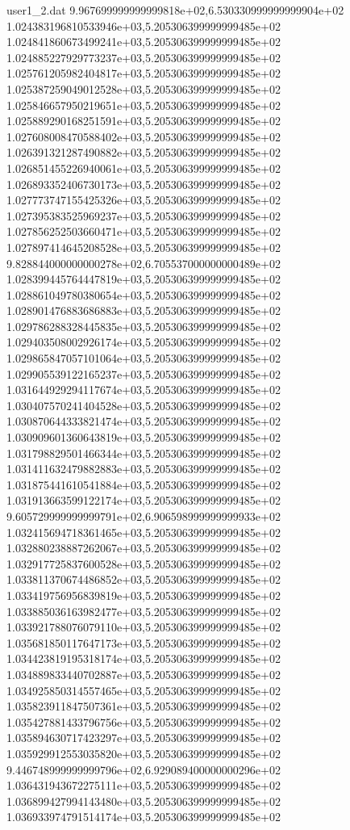\begin{filecontents}{user1_2.dat}
9.967699999999999818e+02,6.530330999999999904e+02
1.024383196810533946e+03,5.205306399999999485e+02
1.024841860673499241e+03,5.205306399999999485e+02
1.024885227929773237e+03,5.205306399999999485e+02
1.025761205982404817e+03,5.205306399999999485e+02
1.025387259049012528e+03,5.205306399999999485e+02
1.025846657950219651e+03,5.205306399999999485e+02
1.025889290168251591e+03,5.205306399999999485e+02
1.027608008470588402e+03,5.205306399999999485e+02
1.026391321287490882e+03,5.205306399999999485e+02
1.026851455226940061e+03,5.205306399999999485e+02
1.026893352406730173e+03,5.205306399999999485e+02
1.027773747155425326e+03,5.205306399999999485e+02
1.027395383525969237e+03,5.205306399999999485e+02
1.027856252503660471e+03,5.205306399999999485e+02
1.027897414645208528e+03,5.205306399999999485e+02
9.828844000000000278e+02,6.705537000000000489e+02
1.028399445764447819e+03,5.205306399999999485e+02
1.028861049780380654e+03,5.205306399999999485e+02
1.028901476883686883e+03,5.205306399999999485e+02
1.029786288328445835e+03,5.205306399999999485e+02
1.029403508002926174e+03,5.205306399999999485e+02
1.029865847057101064e+03,5.205306399999999485e+02
1.029905539122165237e+03,5.205306399999999485e+02
1.031644929294117674e+03,5.205306399999999485e+02
1.030407570241404528e+03,5.205306399999999485e+02
1.030870644333821474e+03,5.205306399999999485e+02
1.030909601360643819e+03,5.205306399999999485e+02
1.031798829501466344e+03,5.205306399999999485e+02
1.031411632479882883e+03,5.205306399999999485e+02
1.031875441610541884e+03,5.205306399999999485e+02
1.031913663599122174e+03,5.205306399999999485e+02
9.605729999999999791e+02,6.906598999999999933e+02
1.032415694718361465e+03,5.205306399999999485e+02
1.032880238887262067e+03,5.205306399999999485e+02
1.032917725837600528e+03,5.205306399999999485e+02
1.033811370674486852e+03,5.205306399999999485e+02
1.033419756956839819e+03,5.205306399999999485e+02
1.033885036163982477e+03,5.205306399999999485e+02
1.033921788076079110e+03,5.205306399999999485e+02
1.035681850117647173e+03,5.205306399999999485e+02
1.034423819195318174e+03,5.205306399999999485e+02
1.034889833440702887e+03,5.205306399999999485e+02
1.034925850314557465e+03,5.205306399999999485e+02
1.035823911847507361e+03,5.205306399999999485e+02
1.035427881433796756e+03,5.205306399999999485e+02
1.035894630717423297e+03,5.205306399999999485e+02
1.035929912553035820e+03,5.205306399999999485e+02
9.446748999999999796e+02,6.929089400000000296e+02
1.036431943672275111e+03,5.205306399999999485e+02
1.036899427994143480e+03,5.205306399999999485e+02
1.036933974791514174e+03,5.205306399999999485e+02

\end{filecontents}
